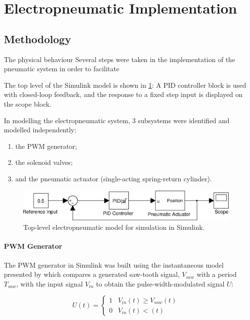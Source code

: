 \section{Electropneumatic Implementation}


\subsection{Methodology}

The physical behaviour 
Several steps were taken in the implementation of the pneumatic system in order to facilitate

The top level of the Simulink model is shown in \ref{fig:pneumatics_top_level}: A PID controller block is used with closed-loop feedback, and the response to a fixed step input is displayed on the scope block.

In modelling the electropneumatic system, 3 subsystems were identified and modelled independently:

\begin{enumerate}
  \item the PWM generator;
  \item the solenoid valves;
  \item and the pneumatic actuator (single-acting spring-return cylinder).
\end{enumerate}

\begin{figure}[h]
\centering
\includegraphics[scale=1]{implementation/figures/pneumatic_modelling1.eps}
\caption{Top-level electropneumatic model for simulation in Simulink.}
\label{fig:pneumatics_top_level}
\end{figure}

\paragraph{PWM Generator}

The PWM generator in Simulink was built using the instantaneous model presented by \citet{valve_models} which compares a generated saw-tooth signal, $V_{saw}$ with a period $T_{saw}$, with the input signal $V_{in}$ to obtain the pulse-width-modulated signal $U$:

\begin{equation}
\label{eq:pwm_generation}
U\left(t\right) = 
\begin{cases}
1 & V_{in}\left(t\right) \geq V_{saw}\left(t\right) \\
0 & V_{in}\left(t\right) < \left(t\right)
\end{cases}
\end{equation}

